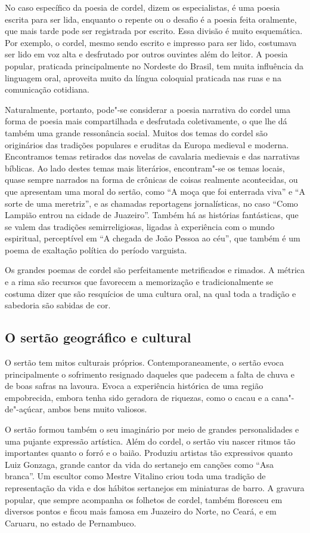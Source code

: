 No caso específico da poesia de cordel, dizem os especialistas, é uma poesia escrita para
ser lida, enquanto o repente ou o desafio é a poesia feita oralmente,
que mais tarde pode ser registrada por escrito. Essa divisão é muito
esquemática. Por exemplo, o cordel, mesmo sendo escrito e impresso para
ser lido, costumava ser lido em voz alta e desfrutado por outros
ouvintes além do leitor. A poesia popular, praticada principalmente no
Nordeste do Brasil, tem muita influência da linguagem oral, aproveita
muito da língua coloquial praticada nas ruas e na comunicação
cotidiana. 

Naturalmente, portanto, pode"-se considerar a poesia narrativa do cordel
uma forma de poesia mais compartilhada e desfrutada coletivamente, o
que lhe dá também uma grande ressonância social. Muitos dos temas do
cordel são originários das tradições populares e eruditas da Europa
medieval e moderna. Encontramos temas retirados das novelas de
cavalaria medievais e das narrativas bíblicas. Ao lado destes temas
mais literários, encontram"-se os temas locais, quase sempre narrados na
forma de crônicas de coisas realmente acontecidas, ou que apresentam
uma moral do sertão, como ``A moça que foi enterrada
viva'' e ``A sorte de uma
meretriz'', e as chamadas reportagens jornalísticas,
no caso ``Como Lampião entrou na cidade de
Juazeiro''. Também há as histórias fantásticas, que
se valem das tradições semirreligiosas, ligadas à experiência com o
mundo espiritual, perceptível em ``A chegada de João
Pessoa ao céu'', que também é um poema de exaltação
política do período varguista. 

Os grandes poemas de cordel são perfeitamente metrificados e rimados. A
métrica e a rima são recursos que favorecem a memorização e
tradicionalmente se costuma dizer que são resquícios de uma cultura
oral, na qual toda a tradição e sabedoria são sabidas de cor.

\subsection{O sertão geográfico e cultural}

O sertão tem mitos culturais próprios. Contemporaneamente, o sertão
evoca principalmente o sofrimento resignado daqueles que padecem a
falta de chuva e de boas safras na lavoura. Evoca a experiência
histórica de uma região empobrecida, embora tenha sido geradora de
riquezas, como o cacau e a cana"-de"-açúcar, ambos bens muito valiosos. 

O sertão formou também o seu imaginário por meio de grandes
personalidades e uma pujante expressão artística. Além do cordel, o
sertão viu nascer ritmos tão importantes quanto o forró e o baião.
Produziu artistas tão expressivos quanto Luiz Gonzaga, grande cantor da
vida do sertanejo em canções como ``Asa
branca''. Um escultor como Mestre Vitalino criou toda
uma tradição de representação da vida e dos hábitos sertanejos em
miniaturas de barro. A gravura popular, que sempre acompanha os
folhetos de cordel, também floresceu em diversos pontos e ficou mais
famosa em Juazeiro do Norte, no Ceará, e em Caruaru, no estado de
Pernambuco. 

